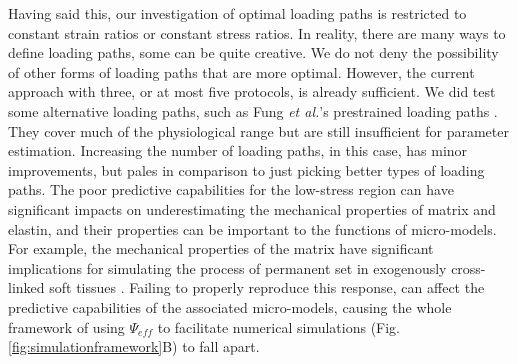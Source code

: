     
    Having said this, our investigation of optimal loading paths is restricted to constant strain ratios or constant stress ratios. In reality, there are many ways to define loading paths, some can be quite creative. We do not deny the possibility of other forms of loading paths that are more optimal. However, the current approach with three, or at most five protocols, is already sufficient. We did test some alternative loading paths, such as Fung \textit{et al.}'s prestrained loading paths \cite{fung_pseudoelasticity_1979}. They cover much of the physiological range but are still insufficient for parameter estimation. Increasing the number of loading paths, in this case, has minor improvements, but pales in comparison to just picking better types of loading paths. The poor predictive capabilities for the low-stress region can have significant impacts on underestimating the mechanical properties of matrix and elastin, and their properties can be important to the functions of micro-models. For example, the mechanical properties of the matrix have significant implications for simulating the process of permanent set in exogenously cross-linked soft tissues \cite{zhang_modeling_2017}. Failing to properly reproduce this response, can affect the predictive capabilities of the associated micro-models, causing the whole framework of using $\Psi_{eff}$ to facilitate numerical simulations (Fig. \ref{fig:simulationframework}B) to fall apart. 
    
    








